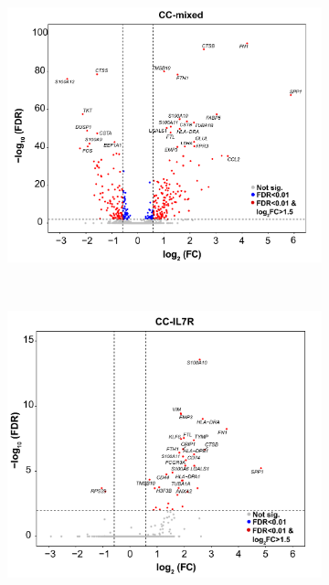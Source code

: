 \bigskip
\begin{figure}[H]
\centering
\begin{subfigure}[b]{0.55\textwidth}
\centering 
\includegraphics[width=\textwidth]{./Results3/pdfs/PSA_10X_all_combined_aligned_monocytes_DGE_SF_vs_PB_cluster_0_vulcano_plot}
\caption{}
\end{subfigure}
~
\begin{subfigure}[b]{0.55\textwidth} 
\centering
\includegraphics[width=\textwidth]{./Results3/pdfs/PSA_10X_all_combined_aligned_monocytes_DGE_SF_vs_PB_IL7R_vulcano_plot}

\end{subfigure}
\end{figure}
